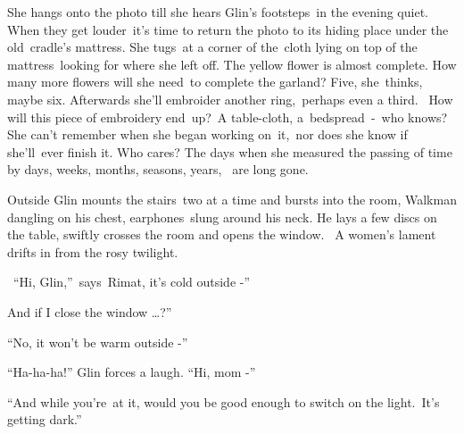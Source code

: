 \documentclass[letterpaper]{article}
\begin{document}
S\textcolor[rgb]{0.13333334,0.13333334,0.13333334}{he hangs onto the photo till she hears Glin's footsteps\ in the
evening quiet. When }they get louder\ \textcolor[rgb]{0.13333334,0.13333334,0.13333334}{it's time to return the photo
to its hiding place under the old\ cradle's mattress. She tugs\ at a corner of
the}\textcolor[rgb]{0.0,0.4392157,0.7529412}{\ }cloth lying on top of the
mattress\textcolor[rgb]{0.13333334,0.13333334,0.13333334}{\ looking for where she left off. The yellow flower is almost
complete. How many more flowers will she need}\ \textcolor[rgb]{0.13333334,0.13333334,0.13333334}{to complete the
garland? Five, she\ }thinks\textcolor[rgb]{0.13333334,0.13333334,0.13333334}{, maybe six. Afterwards she'll embroider
another }ring,\ p\textcolor[rgb]{0.13333334,0.13333334,0.13333334}{erhaps even a third.~
}How\textcolor[rgb]{0.13333334,0.13333334,0.13333334}{ will this piece of embroidery
end\ }up?\textcolor[rgb]{0.13333334,0.13333334,0.13333334}{\ }A\textcolor[rgb]{0.13333334,0.13333334,0.13333334}{
table{}-cloth,} a\ \textcolor[rgb]{0.13333334,0.13333334,0.13333334}{bedspread\ {}-\ who knows? She can't remember when
she began working on\ }it,\ nor does she know if she'll\ \textcolor[rgb]{0.13333334,0.13333334,0.13333334}{ever finish
it. Who cares? }The days when she measured the passing of time by days, weeks, months, seasons, years, \ are long
gone.\ 

\textcolor[rgb]{0.13333334,0.13333334,0.13333334}{Outside Glin }mounts the
stairs\ \textcolor[rgb]{0.13333334,0.13333334,0.13333334}{two at a time and bursts into the room, Walkman dangling on
his chest, earphones~}slung\textcolor[rgb]{0.13333334,0.13333334,0.13333334}{ around his neck. He lays a few discs on
the table, swiftly crosses the room and opens the window.~ A women's lament drifts in from the rosy twilight.}

\textcolor[rgb]{0.13333334,0.13333334,0.13333334}{\ {}``}Hi,\textcolor[rgb]{0.13333334,0.13333334,0.13333334}{
Glin,''\ says\ Rimat, {\textquotedbl}it's cold outside -{}''}

{\textquotedbl}And if I\textcolor[rgb]{0.13333334,0.13333334,0.13333334}{ close the window {\dots}?{}''}

\textcolor[rgb]{0.13333334,0.13333334,0.13333334}{{}``No, it won't be warm outside -{}''}

\textcolor[rgb]{0.13333334,0.13333334,0.13333334}{{}``Ha-ha-ha!'' Glin }forces a
laugh\textcolor[rgb]{0.13333334,0.13333334,0.13333334}{. ``Hi, mom -{}''\ }

\textcolor[rgb]{0.13333334,0.13333334,0.13333334}{{}``And while you're\ at it, }would you be good enough to switch on
the light.\ \textcolor[rgb]{0.13333334,0.13333334,0.13333334}{It's getting dark.{}''}
\end{document}
